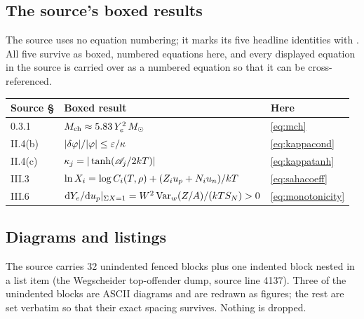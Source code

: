 \subsection{The source's boxed results}
\label{app:equations}

The source uses no equation numbering; it marks its five headline identities
with . All five survive as boxed, numbered equations
here, and every displayed equation in the source is carried over as a numbered
equation so that it can be cross-referenced.

\begin{center}
\begin{tabularx}{\textwidth}{@{}L{2.0cm} Y L{3.6cm}@{}}
\toprule
\textbf{Source \S} & \textbf{Boxed result} & \textbf{Here} \\
.1 & $M_{\mathrm{ch}} \approx 5.83\,Y_{e}^2\,M_{\odot}$ & \eqref{eq:mch} \\
II.4(b) & $|\delta\varphi|/|\varphi| \le \varepsilon/\kappa$ &
  \eqref{eq:kappacond} \\
II.4(c) & $\kappa_j = |\tanh(\mathscr{A}_j/2kT)|$ & \eqref{eq:kappatanh} \\
III.3 & $\ln X_i = \log C_i(T,\rho) + (Z_iu_{p} + N_iu_{n})/kT$ &
  \eqref{eq:sahacoeff} \\
III.6 & $\mathrm{d}Y_{e}/\mathrm{d}u_{p}|_{\Sigma X=1} = W^2\operatorname*{Var}_w(Z/A)/(kT S_N) > 0$ &
  \eqref{eq:monotonicity} \\
\bottomrule
\end{tabularx}
\end{center}

\subsection{Diagrams and listings}
\label{app:diagrams}

The source carries 32 unindented fenced blocks plus one indented block nested in
a list item (the Wegscheider top-offender dump, source line 4137). Three of the
unindented blocks are ASCII diagrams and are redrawn as figures; the rest are
set verbatim so that their exact spacing survives. Nothing is dropped.

